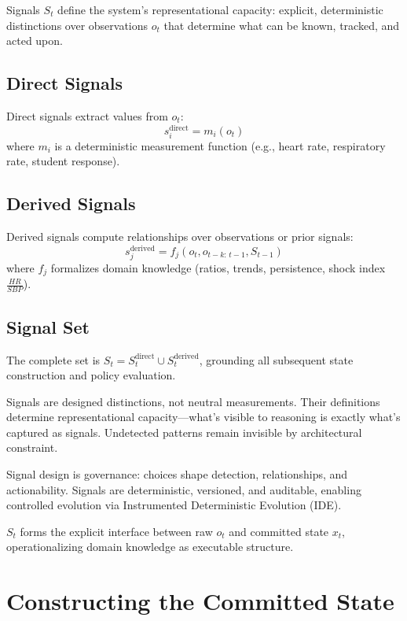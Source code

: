 \documentclass[11pt]{article}
\begin{document}
Signals $S_t$ define the system's representational capacity: explicit, deterministic distinctions over observations $o_t$ that determine what can be known, tracked, and acted upon.

\subsection{Direct Signals}
Direct signals extract values from $o_t$:
\begin{equation}
s_i^{\mathrm{direct}} = m_i(o_t)
\end{equation}
where $m_i$ is a deterministic measurement function (e.g., heart rate, respiratory rate, student response).

\subsection{Derived Signals}
Derived signals compute relationships over observations or prior signals:
\begin{equation}
s_j^{\mathrm{derived}} = f_j(o_t, o_{t-k:\,t-1}, S_{t-1})
\end{equation}
where $f_j$ formalizes domain knowledge (ratios, trends, persistence, shock index $\frac{HR}{SBP}$).

\subsection{Signal Set}
The complete set is $S_t = S_t^{\mathrm{direct}} \cup S_t^{\mathrm{derived}}$, grounding all subsequent state construction and policy evaluation.

Signals are designed distinctions, not neutral measurements. Their definitions determine representational capacity---what's visible to reasoning is exactly what's captured as signals. Undetected patterns remain invisible by architectural constraint.

Signal design is governance: choices shape detection, relationships, and actionability. Signals are deterministic, versioned, and auditable, enabling controlled evolution via Instrumented Deterministic Evolution (IDE).

$S_t$ forms the explicit interface between raw $o_t$ and committed state $x_t$, operationalizing domain knowledge as executable structure.


\section{Constructing the Committed State}
\end{document}

